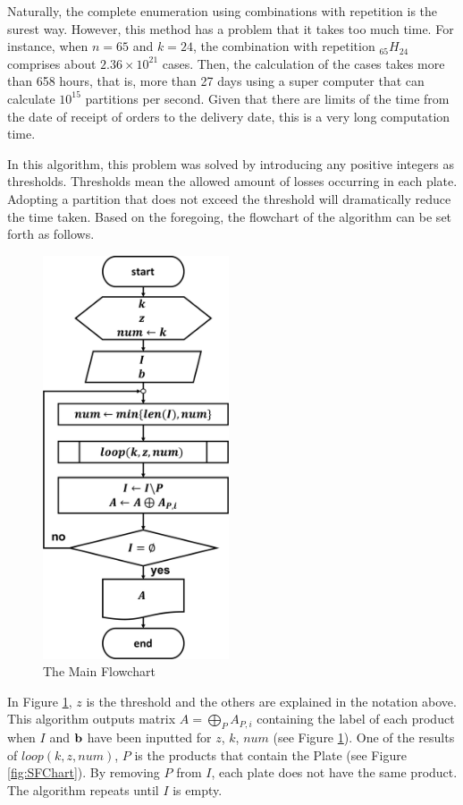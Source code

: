 \documentclass[a4paper]{amsart}
\numberwithin{equation}{section} %
\numberwithin{figure}{section} %
\numberwithin{table}{section}
\theoremstyle{plain}
\theoremstyle{definition}
\theoremstyle{plain}
\theoremstyle{plain}
\theoremstyle{plain}
\theoremstyle{plain}
\theoremstyle{plain}
\begin{document}
Naturally, the complete enumeration using combinations with repetition is the surest way. 
However, this method has a problem that it takes too much time. 
For instance, when $n=65$ and $k = 24$, the combination with repetition $_{65}H_{24}$ comprises about $2.36 \times 10^{21}$ cases.
Then, the calculation of the cases takes more than 658 hours, that is, more than 27 days using a super computer that can calculate $10^{15}$ partitions per second. 
Given that there are limits of the time from the date of receipt of orders to the delivery date, this is a very long computation time.

In this algorithm, this problem was solved by introducing any positive integers as thresholds. 
Thresholds mean the allowed amount of losses occurring in each plate. 
Adopting a partition that does not exceed the threshold will dramatically reduce the time taken.
Based on the foregoing, the flowchart of the algorithm can be set forth as follows.

\begin{figure}[h!]
	\centering
	\includegraphics[width=5.5cm]{MainFChart.pdf}
	\caption{The Main Flowchart}
	\label{fig:MFChart}       %
\end{figure}

In Figure \ref{fig:MFChart}, $z$ is the threshold and the others are explained in the notation above.
This algorithm outputs matrix $A=\bigoplus\limits_{P} A_{P,i}$ containing the label of each product when $I$ and ${\bf b}$ have been inputted for $z$, $k$, $num$ (see Figure \ref{fig:MFChart}). 
One of the results of ${loop}(k, z, num)$, $P$ is the products that contain the Plate (see Figure \ref{fig:SFChart}). 
By removing $P$ from $I$, each plate does not have the same product.
The algorithm repeats until $I$ is empty.
\end{document}

